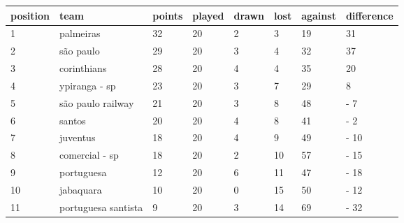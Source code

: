 \documentclass{article}
\begin{document}
\begin{tabular}{llllllll}
\toprule
position & team & points & played & drawn & lost & against & difference \\
\midrule
1 & palmeiras & 32 & 20 & 2 & 3 & 19 & 31 \\
2 & são paulo & 29 & 20 & 3 & 4 & 32 & 37 \\
3 & corinthians & 28 & 20 & 4 & 4 & 35 & 20 \\
4 & ypiranga - sp & 23 & 20 & 3 & 7 & 29 & 8 \\
5 & são paulo railway & 21 & 20 & 3 & 8 & 48 & - 7 \\
6 & santos & 20 & 20 & 4 & 8 & 41 & - 2 \\
7 & juventus & 18 & 20 & 4 & 9 & 49 & - 10 \\
8 & comercial - sp & 18 & 20 & 2 & 10 & 57 & - 15 \\
9 & portuguesa & 12 & 20 & 6 & 11 & 47 & - 18 \\
10 & jabaquara & 10 & 20 & 0 & 15 & 50 & - 12 \\
11 & portuguesa santista & 9 & 20 & 3 & 14 & 69 & - 32 \\
\bottomrule
\end{tabular}
\end{document}
